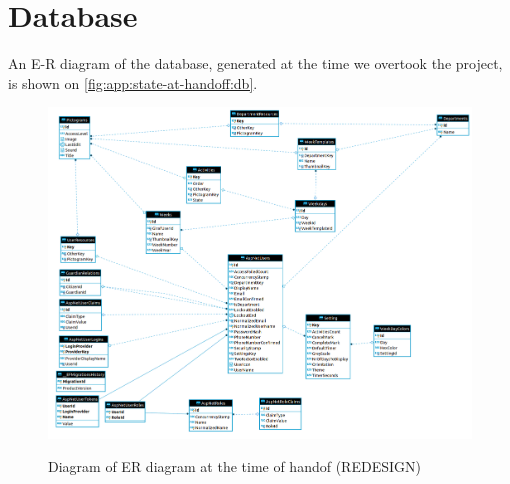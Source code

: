 \section{Database}\label{app:state-at-handoff:db}

An E-R diagram of the database, generated at the time we overtook the project, is shown on \autoref{fig:app:state-at-handoff:db}.

\begin{figure}[h]
    \centering
    \caption{Diagram of ER diagram at the time of handof (REDESIGN)}
    \includegraphics[width=1\textwidth]{figures/db_ho.png}
    \label{fig:app:state-at-handoff:db}
\end{figure}
